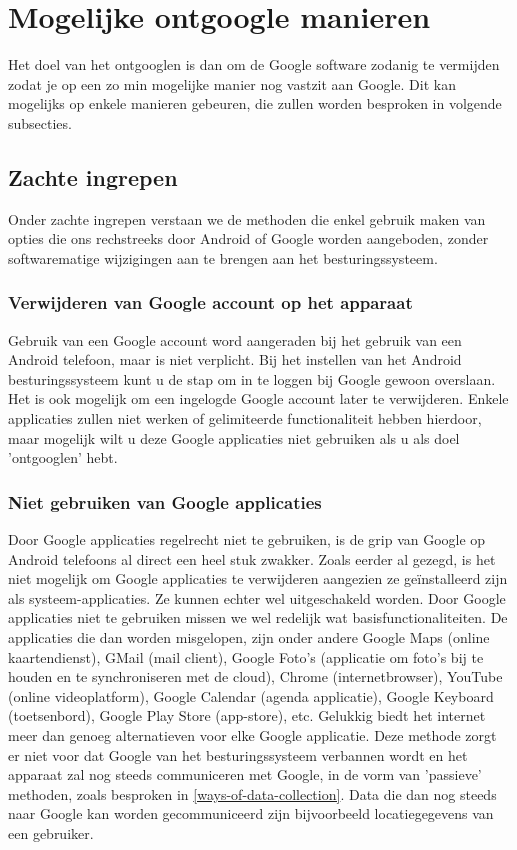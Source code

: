 \section{Mogelijke ontgoogle manieren}

Het doel van het ontgooglen is dan om de Google software zodanig te vermijden zodat je op  een zo min mogelijke manier nog vastzit aan Google. Dit kan mogelijks op enkele manieren gebeuren, die zullen worden besproken in volgende subsecties.

\subsection{Zachte ingrepen}

Onder zachte ingrepen verstaan we de methoden die enkel gebruik maken van opties die ons rechstreeks door Android of Google worden aangeboden, zonder softwarematige wijzigingen aan te brengen aan het besturingssysteem.

\subsubsection{Verwijderen van Google account op het apparaat}

Gebruik van een Google account word aangeraden bij het gebruik van een Android telefoon, maar is niet verplicht. Bij het instellen van het Android besturingssysteem kunt u de stap om in te loggen bij Google gewoon overslaan. Het is ook mogelijk om een ingelogde Google account later te verwijderen. Enkele applicaties zullen niet werken of gelimiteerde functionaliteit hebben hierdoor, maar mogelijk wilt u deze Google applicaties niet gebruiken als u als doel 'ontgooglen' hebt.

\subsubsection{Niet gebruiken van Google applicaties}
Door Google applicaties regelrecht niet te gebruiken, is de grip van Google op Android telefoons al direct een heel stuk zwakker.
Zoals eerder al gezegd, is het niet mogelijk om Google applicaties te verwijderen aangezien ze geïnstalleerd zijn als systeem-applicaties. Ze kunnen echter wel uitgeschakeld worden. Door Google applicaties niet te gebruiken missen we wel redelijk wat basisfunctionaliteiten. De applicaties die dan worden misgelopen, zijn onder andere Google Maps (online kaartendienst), GMail (mail client), Google Foto's (applicatie om foto's bij te houden en te synchroniseren met de cloud), Chrome (internetbrowser), YouTube (online videoplatform), Google Calendar (agenda applicatie), Google Keyboard (toetsenbord), Google Play Store (app-store), etc.  Gelukkig biedt het internet meer dan genoeg alternatieven voor elke Google applicatie. Deze methode zorgt er niet voor dat Google van het besturingssysteem verbannen wordt en het apparaat zal nog steeds communiceren met Google, in de vorm van 'passieve' methoden, zoals besproken in \ref{ways-of-data-collection}. Data die dan nog steeds naar Google kan worden gecommuniceerd zijn bijvoorbeeld locatiegegevens van een gebruiker.

